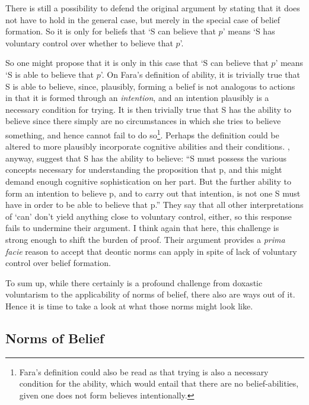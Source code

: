 \documentclass[12pt,numbers=noenddot]{scrartcl}
\begin{document}
There is still a possibility to defend the original argument by stating that it does not have to hold in the general case, but merely in the special case of belief formation. So it is only for beliefs that ‘S can believe that $p$’ means ‘S has voluntary control over whether to believe that $p$’.

So one might propose that it is only in this case that ‘S can believe that $p$’ means ‘S is able to believe that $p$’. On Fara's definition of ability, it is trivially true that S is able to believe, since, plausibly, forming a belief is not analogous to actions in that it is formed through an \emph{intention}, and an intention plausibly is a necessary condition for trying. It is then trivially true that S has the ability to believe since there simply are no circumstances in which she tries to believe something, and hence cannot fail to do so\footnote{Fara's definition could also be read as that trying is also a necessary condition for the ability, which would entail that there are no belief-abilities, given one does not form believes intentionally.}. Perhaps the definition could be altered to more plausibly incorporate cognitive abilities and their conditions. \textcite[618]{Chuard2009-CHUENW}, anyway, suggest that S has the ability to believe: “S must possess the various concepts necessary for understanding the proposition that p, and this might demand enough cognitive sophistication on her part. But the further ability to form an intention to believe p, and to carry out that intention, is not one S must have in order to be able to believe that p.” They say that all other interpretations of ‘can’ don't yield anything close to voluntary control, either, so this response fails to undermine their argument. I think again that here, this challenge is strong enough to shift the burden of proof. Their argument provides a \emph{prima facie} reason to accept that deontic norms can apply in spite of lack of voluntary control over belief formation.

To sum up, while there certainly is a profound challenge from doxastic voluntarism to the applicability of norms of belief, there also are ways out of it. Hence it is time to take a look at what those norms might look like.

\subsection{ Norms of Belief }\label{sec:normsofbelief}
\end{document}
